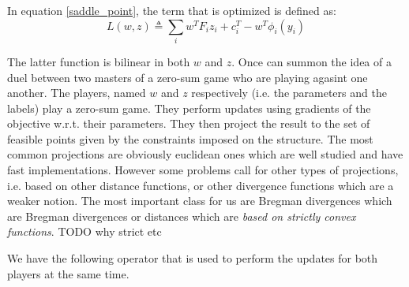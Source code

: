 In equation \ref{saddle_point}, the term that is optimized is defined
as:
\begin{equation}
  {L}( w, z) \triangleq \sum_i  w^T  F_i  z_i + 
c_i^T -  w^T  \phi_i( y_i)
  \label{saddle_obj}
\end{equation}


\clearpage

The latter function is bilinear in both $w$ and $z$. Once can summon the idea of
a duel between two masters of a zero-sum game who are playing agasint one
another. The players, named $w$ and $z$ 
respectively (i.e. the parameters and the labels) play a zero-sum game. They
perform updates using gradients of the objective w.r.t. their parameters. They
then project the result to the set of feasible points given by the constraints
imposed on the structure. The most common projections are obviously euclidean
ones which are well studied and have fast implementations. However some problems
call for other types of projections, i.e. based on other distance functions, or
other divergence functions which are a weaker notion. The most important class
for us are Bregman divergences which are Bregman divergences or distances which
are \emph{based on strictly convex functions}. TODO why strict etc

We have the following operator that is used to perform the updates for
both players at the same time.

